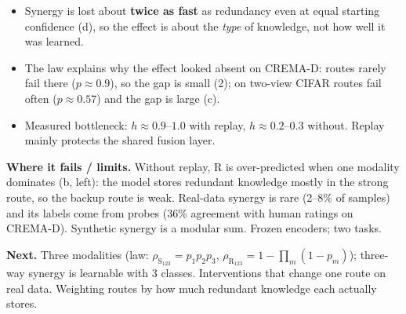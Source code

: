 \documentclass[10pt]{article}
\begin{document}
\vspace{3pt}
\begin{itemize}
\item Synergy is lost about \textbf{twice as fast} as redundancy even at equal starting confidence (d), so the effect is about
the \emph{type} of knowledge, not how well it was learned.
\item The law explains why the effect looked absent on CREMA-D: routes rarely fail there ($p\approx0.9$), so the gap is small (2); on
two-view CIFAR routes fail often ($p\approx0.57$) and the gap is large (c).
\item Measured bottleneck: $h\approx0.9$--$1.0$ with replay, $h\approx0.2$--$0.3$ without. Replay mainly protects the shared fusion layer.
\end{itemize}

\textbf{Where it fails / limits.} Without replay, R is over-predicted when one modality dominates (b, left): the model stores
redundant knowledge mostly in the strong route, so the backup route is weak. Real-data synergy is rare (2--8\% of samples) and its
labels come from probes (36\% agreement with human ratings on CREMA-D). Synthetic synergy is a modular sum. Frozen encoders; two tasks.

\textbf{Next.} Three modalities (law: $\rho_{\text{S}_{123}}=p_1p_2p_3$, $\rho_{\text{R}_{123}}=1-\prod_m(1-p_m)$); three-way synergy is learnable
with 3 classes. Interventions that change one route on real data. Weighting routes by how much redundant knowledge each actually stores.
\end{document}
